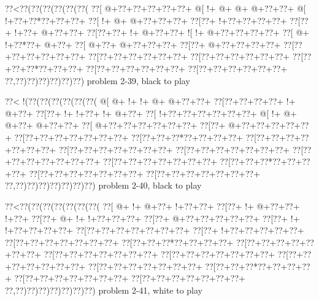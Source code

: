 \vbox{\vbox{\goo
\0??<\0??(\0??(\0??(\0??(\0??(\0??(
\0??[\- @+\0??+\0??+\0??+\0??+\0??+
\- @[\- !+\- @+\- @+\- @+\0??+\0??+
\- @[\- !+\0??+\0??*\0??+\0??+\0??+
\0??[\- !+\- @+\- @+\0??+\0??+\0??+
\0??[\0??+\- !+\0??+\0??+\0??+\0??+
\0??[\0??+\- !+\0??+\- @+\0??+\0??+
\0??[\0??+\0??+\- !+\- @+\0??+\0??+
\- ![\- !+\- @+\0??+\0??+\0??+\0??+
\0??[\- @+\- !+\0??*\0??+\- @+\0??+
\0??[\- @+\0??+\- @+\0??+\0??+\0??+
\0??[\0??+\- @+\0??+\0??+\0??+\0??+
\0??[\0??+\0??+\0??+\0??+\0??+\0??+
\0??[\0??+\0??+\0??+\0??+\0??+\0??+
\0??[\0??+\0??+\0??+\0??+\0??+\0??+
\0??[\0??+\0??+\0??*\0??+\0??+\0??+
\0??[\0??+\0??+\0??+\0??+\0??+\0??+
\0??[\0??+\0??+\0??+\0??+\0??+\0??+
\0??,\0??)\0??)\0??)\0??)\0??)\0??)
}
\hfil problem 2-39, black to play\hfil\break
}

\vbox{\vbox{\goo
\0??<\- !(\0??(\0??(\0??(\0??(\0??(\0??(
\- @[\- @+\- !+\- !+\- @+\- @+\0??+\0??+
\0??[\0??+\0??+\0??+\0??+\- !+\- @+\0??+
\0??[\0??+\- !+\- !+\0??+\- !+\- @+\0??+
\0??[\- !+\0??+\0??+\0??+\0??+\0??+\0??+
\- @[\- !+\- @+\- @+\0??+\- @+\0??+\0??+
\0??[\- @+\0??+\0??+\0??+\0??+\0??+\0??+
\0??[\0??+\- @+\0??+\0??+\0??+\0??+\0??+
\0??[\0??+\0??+\0??+\0??+\0??+\0??+\0??+
\0??[\0??+\0??+\0??*\0??+\0??+\0??+\0??+
\0??[\0??+\0??+\0??+\0??+\0??+\0??+\0??+
\0??[\0??+\0??+\0??+\0??+\0??+\0??+\0??+
\0??[\0??+\0??+\0??+\0??+\0??+\0??+\0??+
\0??[\0??+\0??+\0??+\0??+\0??+\0??+\0??+
\0??[\0??+\0??+\0??+\0??+\0??+\0??+\0??+
\0??[\0??+\0??+\0??*\0??+\0??+\0??+\0??+
\0??[\0??+\0??+\0??+\0??+\0??+\0??+\0??+
\0??[\0??+\0??+\0??+\0??+\0??+\0??+\0??+
\0??,\0??)\0??)\0??)\0??)\0??)\0??)\0??)
}
\hfil problem 2-40, black to play\hfil\break
}

\vbox{\vbox{\goo
\0??<\0??(\0??(\0??(\0??(\0??(\0??(\0??(
\0??[\- @+\- !+\- @+\0??+\- !+\0??+\0??+
\0??[\0??+\- !+\- @+\0??+\0??+\- !+\0??+
\0??[\0??+\- @+\- !+\- !+\0??+\0??+\0??+
\0??[\0??+\- @+\0??+\0??+\0??+\0??+\0??+
\0??[\0??+\- !+\- !+\0??+\0??+\0??+\0??+
\0??[\0??+\0??+\0??+\0??+\0??+\0??+\0??+
\0??[\0??+\- !+\0??+\0??+\0??+\0??+\0??+
\0??[\0??+\0??+\0??+\0??+\0??+\0??+\0??+
\0??[\0??+\0??+\0??*\0??+\0??+\0??+\0??+
\0??[\0??+\0??+\0??+\0??+\0??+\0??+\0??+
\0??[\0??+\0??+\0??+\0??+\0??+\0??+\0??+
\0??[\0??+\0??+\0??+\0??+\0??+\0??+\0??+
\0??[\0??+\0??+\0??+\0??+\0??+\0??+\0??+
\0??[\0??+\0??+\0??+\0??+\0??+\0??+\0??+
\0??[\0??+\0??+\0??*\0??+\0??+\0??+\0??+
\0??[\0??+\0??+\0??+\0??+\0??+\0??+\0??+
\0??[\0??+\0??+\0??+\0??+\0??+\0??+\0??+
\0??,\0??)\0??)\0??)\0??)\0??)\0??)\0??)
}
\hfil problem 2-41, white to play\hfil\break
}

